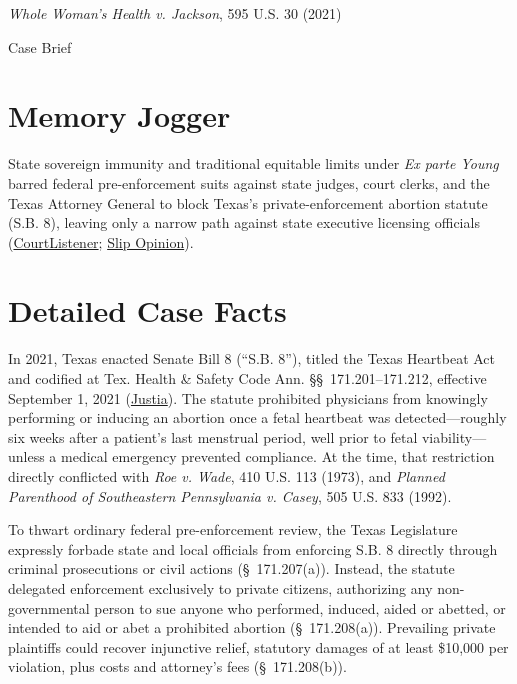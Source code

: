 \documentclass[12pt]{article}
\begin{document}
\begin{center}
{\LARGE \textit{Whole Woman's Health v. Jackson}, 595 U.S. 30 (2021)\par}
\vspace{0.8em}
{\large Case Brief\par}
\end{center}
\vspace{1em}

\section{Memory Jogger}

State sovereign immunity and traditional equitable limits under \textit{Ex parte Young} barred federal pre-enforcement suits against state judges, court clerks, and the Texas Attorney General to block Texas's private-enforcement abortion statute (S.B. 8), leaving only a narrow path against state executive licensing officials (\href{https://www.courtlistener.com/opinion/5305640/whole-womans-health-v-jackson/}{CourtListener}; \href{https://www.supremecourt.gov/opinions/21pdf/21-463_3ebh.pdf}{Slip Opinion}).

\section{Detailed Case Facts}

In 2021, Texas enacted Senate Bill 8 (``S.B. 8''), titled the Texas Heartbeat Act and codified at Tex. Health \& Safety Code Ann. \S\S~171.201--171.212, effective September 1, 2021 (\href{https://supreme.justia.com/cases/federal/us/595/21-463/}{Justia}). The statute prohibited physicians from knowingly performing or inducing an abortion once a fetal heartbeat was detected---roughly six weeks after a patient's last menstrual period, well prior to fetal viability---unless a medical emergency prevented compliance. At the time, that restriction directly conflicted with \textit{Roe v. Wade}, 410 U.S. 113 (1973), and \textit{Planned Parenthood of Southeastern Pennsylvania v. Casey}, 505 U.S. 833 (1992).

To thwart ordinary federal pre-enforcement review, the Texas Legislature expressly forbade state and local officials from enforcing S.B. 8 directly through criminal prosecutions or civil actions (\S~171.207(a)). Instead, the statute delegated enforcement exclusively to private citizens, authorizing any non-governmental person to sue anyone who performed, induced, aided or abetted, or intended to aid or abet a prohibited abortion (\S~171.208(a)). Prevailing private plaintiffs could recover injunctive relief, statutory damages of at least \$10,000 per violation, plus costs and attorney's fees (\S~171.208(b)).
\end{document}
